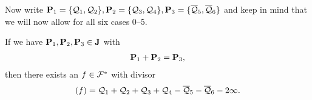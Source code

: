 \documentclass[english,11pt,a4paper]{article}
\begin{document}
Now write $\P_1 = \{ \q_1, \q_2 \}, \P_2 = \{ \q_3, \q_4 \}, \P_3 = \{ \bar \q_5, \bar \q_6 \}$ and keep in mind that we will now allow for all six cases 0--5.

\begin{theorem}\label{hhs}
  If we have $\P_1, \P_2, \P_3 \in \J$ with
  \begin{align*}
    \P_1 + \P_2 = \P_3,
  \end{align*}
  then there exists an $f \in \F^*$ with divisor
  \begin{align*}
    (f) = \q_1 + \q_2 + \q_3 + \q_4 - \bar \q_5 - \bar \q_6 - 2 \infty.
  \end{align*}
\end{theorem}

\newpage
\end{document}
